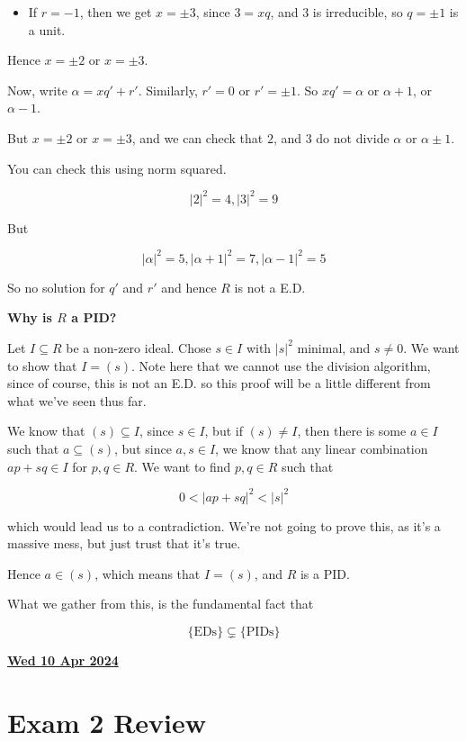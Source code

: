 \documentclass[12pt]{article}
\renewcommand{\date}[1]{\underline{\bf #1}}
\theoremstyle{remark}
\theoremstyle{remark}
\theoremstyle{remark}
\theoremstyle{remark}
\theoremstyle{remark}
\begin{document}
{\begin{itemize}
    \item If $r = -1$, then we get $x = \pm 3$, since $3 = xq$, and $3$ is
      irreducible, so $q = \pm 1$ is a unit.
  \end{itemize}

  Hence $x = \pm 2$ or $x = \pm 3$.

  Now, write $\alpha = xq' + r'$. Similarly, $r' = 0$ or $r' = \pm 1$. So $xq' =
  \alpha$ or $\alpha + 1$, or $\alpha - 1$.

  But $x = \pm 2$ or $x = \pm 3$, and we can check that $2$, and $3$ do not
  divide $\alpha$ or $\alpha \pm 1$.

  You can check this using norm squared.

  \[
    |2|^2 = 4, |3|^2 = 9
  \]

  But

  \[
    |\alpha|^2 = 5, |\alpha + 1|^2 = 7, |\alpha - 1|^2 = 5
  \]

  So no solution for $q'$ and $r'$ and hence $R$ is not a E.D.

  {\bf Why is $R$ a PID?}

  Let $I \subseteq R$ be a non-zero ideal. Chose $s \in I$ with $|s|^2$ minimal,
  and $s \ne 0$. We want to show that $I = (s)$. Note here that we cannot use
  the division algorithm, since of course, this is not an E.D. so this proof
  will be a little different from what we've seen thus far.

  We know that $(s) \subseteq I$, since $s \in I$, but if $(s) \ne I$, then
  there is some $a \in I$ such that $a \subseteq (s)$, but since $a, s \in I$,
  we know that any linear combination $ap + sq \in I$ for $p, q \in R$. We want
  to find $p, q \in R$ such that

  \[
    0 < |ap + sq|^2 < |s|^2
  \]

  which would lead us to a contradiction. We're not going to prove this, as it's
  a massive mess, but just trust that it's true.

  Hence $a \in (s)$, which means that $I = (s)$, and $R$ is a PID.
}

What we gather from this, is the fundamental fact that

\[
  \{\text{EDs}\} \subsetneq \{\text{PIDs}\}
\]

\date{Wed 10 Apr 2024}

\section{Exam 2 Review}
\end{document}
